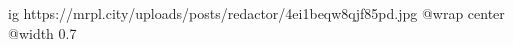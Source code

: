  
 
 
 
 

\ifcmt
  ig https://mrpl.city/uploads/posts/redactor/4ei1beqw8qjf85pd.jpg
  @wrap center
  @width 0.7
\fi
